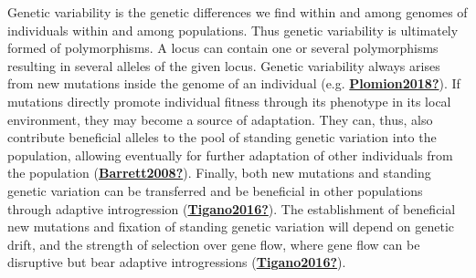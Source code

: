 \documentclass[12pt,twoside,a4paper, a]{article}
\begin{document}
Genetic variability is the genetic differences we find within and among genomes of individuals within and among populations.
Thus genetic variability is ultimately formed of polymorphisms.
A locus can contain one or several polymorphisms resulting in several alleles of the given locus.
Genetic variability always arises from new mutations inside the genome of an individual (e.g. \protect\hyperlink{ref-Plomion2018}{\textbf{Plomion2018?}}).
If mutations directly promote individual fitness through its phenotype in its local environment, they may become a source of adaptation.
They can, thus, also contribute beneficial alleles to the pool of standing genetic variation into the population, allowing eventually for further adaptation of other individuals from the population (\protect\hyperlink{ref-Barrett2008}{\textbf{Barrett2008?}}).
Finally, both new mutations and standing genetic variation can be transferred and be beneficial in other populations through adaptive introgression (\protect\hyperlink{ref-Tigano2016}{\textbf{Tigano2016?}}).
The establishment of beneficial new mutations and fixation of standing genetic variation will depend on genetic drift, and the strength of selection over gene flow,
where gene flow can be disruptive but bear adaptive introgressions (\protect\hyperlink{ref-Tigano2016}{\textbf{Tigano2016?}}).
\end{document}
